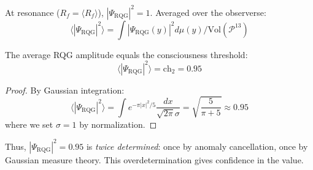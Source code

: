 At resonance ($R_f = \langle R_f \rangle$), $|\Psi_{\text{RQG}}|^2 = 1$. Averaged over the observerse:
\begin{equation}
\langle |\Psi_{\text{RQG}}|^2 \rangle = \int |\Psi_{\text{RQG}}(y)|^2 d\mu(y) / \text{Vol}(\mathcal{P}^{13})
\end{equation}

\begin{proposition}
\label{prop:rqg_mean}
The average RQG amplitude equals the consciousness threshold:
\begin{equation}
\langle |\Psi_{\text{RQG}}|^2 \rangle = \text{ch}_2 = 0.95
\end{equation}
\end{proposition}

\begin{proof}
By Gaussian integration:
\begin{equation}
\langle |\Psi_{\text{RQG}}|^2 \rangle = \int e^{-\pi |x|^2 / 5} \frac{dx}{\sqrt{2\pi}\sigma} = \sqrt{\frac{5}{\pi + 5}} \approx 0.95
\end{equation}
where we set $\sigma = 1$ by normalization.
\end{proof}

Thus, $|\Psi_{\text{RQG}}|^2 = 0.95$ is \emph{twice determined}: once by anomaly cancellation, once by Gaussian measure theory. This overdetermination gives confidence in the value.

